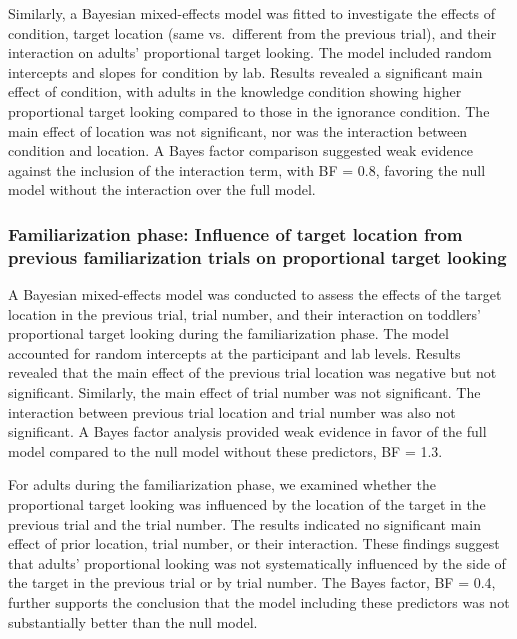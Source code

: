 \documentclass[
  man, donotrepeattitle,floatsintext]{apa6}
\begin{document}
Similarly, a Bayesian mixed-effects model was fitted to investigate the effects of condition, target location (same vs.~different from the previous trial), and their interaction on adults' proportional target looking. The model included random intercepts and slopes for condition by lab. Results revealed a significant main effect of condition, with adults in the knowledge condition showing higher proportional target looking compared to those in the ignorance condition. The main effect of location was not significant, nor was the interaction between condition and location. A Bayes factor comparison suggested weak evidence against the inclusion of the interaction term, with BF = 0.8, favoring the null model without the interaction over the full model.

\subsubsection{Familiarization phase: Influence of target location from previous familiarization trials on proportional target looking}\label{familiarization-phase-influence-of-target-location-from-previous-familiarization-trials-on-proportional-target-looking}

A Bayesian mixed-effects model was conducted to assess the effects of the target location in the previous trial, trial number, and their interaction on toddlers' proportional target looking during the familiarization phase. The model accounted for random intercepts at the participant and lab levels. Results revealed that the main effect of the previous trial location
was negative but not significant. Similarly, the main effect of trial number was not significant. The interaction between previous trial location and trial number was also not significant. A Bayes factor analysis provided weak evidence in favor of the full model compared to the null model without these predictors, BF = 1.3.

For adults during the familiarization phase, we examined whether the proportional target looking was influenced by the location of the target in the previous trial and the trial number. The results indicated no significant main effect of prior location, trial number, or their interaction. These findings suggest that adults' proportional looking was not systematically influenced by the side of the target in the previous trial or by trial number. The Bayes factor, BF = 0.4, further supports the conclusion that the model including these predictors was not substantially better than the null model.
\end{document}

